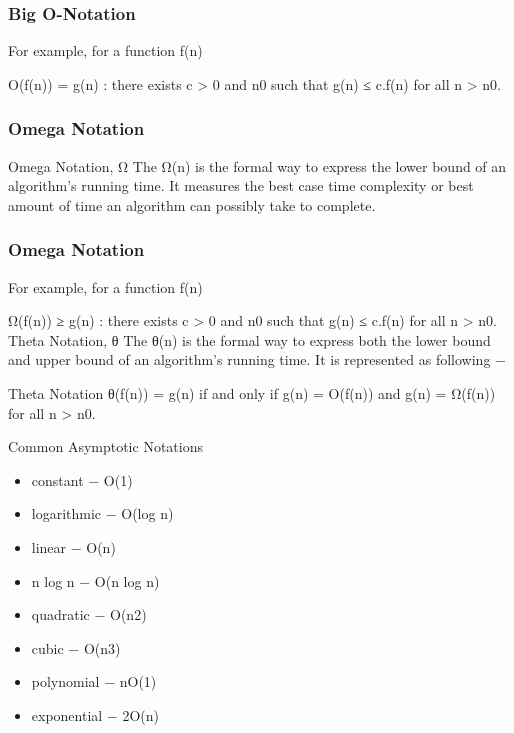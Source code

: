 \documentclass{beamer}
\begin{document}
\begin{frame}
\frametitle{Big O-Notation}
For example, for a function f(n)

Ο(f(n)) = { g(n) : there exists c > 0 and n0 such that g(n) ≤ c.f(n) for all n > n0. }
\end{frame}
\begin{frame}
\frametitle{Omega Notation}
\large
Omega Notation, Ω
The Ω(n) is the formal way to express the lower bound of an algorithm's running time. It measures the best case time complexity or best amount of time an algorithm can possibly take to complete.
\end{frame}
\begin{frame}
\frametitle{Omega Notation}
\large
For example, for a function f(n)

Ω(f(n)) ≥ { g(n) : there exists c > 0 and n0 such that g(n) ≤ c.f(n) for all n > n0. }
Theta Notation, θ
The θ(n) is the formal way to express both the lower bound and upper bound of an algorithm's running time. It is represented as following −
\end{frame}
\begin{frame}
Theta Notation
θ(f(n)) = { g(n) if and only if g(n) =  Ο(f(n)) and g(n) = Ω(f(n)) for all n > n0. }
\end{frame}
\begin{frame}
Common Asymptotic Notations
\begin{itemize}
\item constant	−	Ο(1)
\item logarithmic	−	Ο(log n)
\item linear	−	Ο(n)
\item n log n	−	Ο(n log n)
\item quadratic	−	Ο(n2)
\item cubic	−	Ο(n3)
\item polynomial	−	nΟ(1)
\item exponential	−	2Ο(n)
\end{itemize}
\end{frame}

\end{document}
